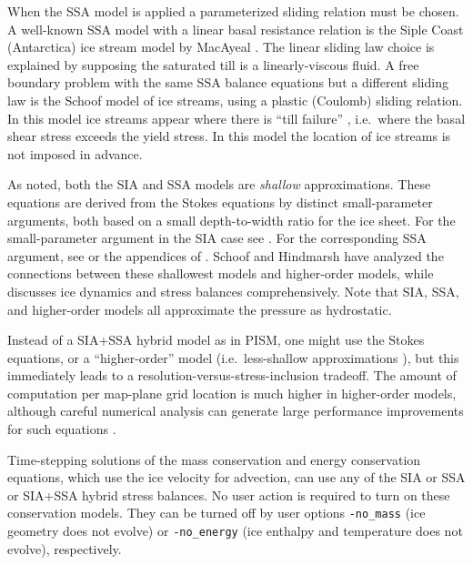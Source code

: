 When the SSA model is applied a parameterized sliding relation must be chosen.  A well-known SSA model with a linear basal resistance relation is the Siple Coast (Antarctica) ice stream model by MacAyeal \cite{MacAyeal}.  The linear sliding law choice is explained by supposing the saturated till is a linearly-viscous fluid.  A free boundary problem with the same SSA balance equations but a different sliding law is the Schoof \cite{SchoofStream} model of ice streams, using a plastic (Coulomb) sliding relation.  In this model ice streams appear where there is ``till failure'' \cite{Paterson}, i.e.~where the basal shear stress exceeds the yield stress.  In this model the location of ice streams is not imposed in advance.

As noted, both the SIA and SSA models are \emph{shallow} approximations.  These equations are derived from the Stokes equations by distinct small-parameter arguments, both based on a small depth-to-width ratio for the ice sheet.  For the small-parameter argument in the SIA case see \cite{Fowler}.  For the corresponding SSA argument, see \cite{WeisGreveHutter} or the appendices of \cite{SchoofStream}.  Schoof and Hindmarsh \cite{SchoofHindmarsh} have analyzed the connections between these shallowest models and higher-order models, while \cite{GreveBlatter2009} discusses ice dynamics and stress balances comprehensively.  Note that SIA, SSA, and higher-order models all approximate the pressure as hydrostatic.

Instead of a SIA+SSA hybrid model as in PISM, one might use the Stokes equations, or a ``higher-order'' model (i.e.~less-shallow approximations \cite{Blatter,Pattyn03}), but this immediately leads to a resolution-versus-stress-inclusion tradeoff.  The amount of computation per map-plane grid location is much higher in higher-order models, although careful numerical analysis can generate large performance improvements for such equations \cite{BrownSmithAhmadia2013}.

Time-stepping solutions of the mass conservation and energy conservation equations, which use the ice velocity for advection, can use any of the SIA or SSA or SIA+SSA hybrid stress balances.  No user action is required to turn on these conservation models.  They can be turned off by user options \texttt{-no_mass} (ice geometry does not evolve) or \texttt{-no_energy} (ice enthalpy and temperature does not evolve), respectively.

\newenvironment{tightlist}{\begin{itemize}  \vspace{-0.15in}\addtolength{\itemsep}{-0.5\baselineskip} } {\vspace{-0.1in} \end{itemize}}

